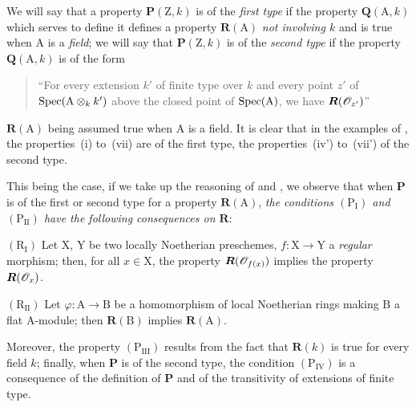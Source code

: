 \begin{env}[7.3.10]
\label{IV.7.3.10}
We will say that a property $\boldsymbol{P}(\mathrm{Z},k)$ is of the \emph{first type} if the property $\boldsymbol{Q}(\mathrm{A},k)$ which serves to define it defines a property $\boldsymbol{R}(\mathrm{A})$ \emph{not involving $k$} and is true when $\mathrm{A}$ is a \emph{field}; we will say that $\boldsymbol{P}(\mathrm{Z},k)$ is of the \emph{second type} if the property $\boldsymbol{Q}(\mathrm{A},k)$ is of the form
\begin{quote}
``For every extension $k'$ of finite type over $k$ and every point $z'$ of $\operatorname{Spec}(\mathrm{A}\otimes_k k')$ above the closed point of $\operatorname{Spec}(\mathrm{A})$, we have $\boldsymbol{R}(\mathscr{O}_{z'})$''
\end{quote}
$\boldsymbol{R}(\mathrm{A})$ being assumed true when $\mathrm{A}$ is a field.
It is clear that in the examples of , the properties~(i) to~(vii) are of the first type, the properties~(iv') to~(vii') of the second type.

This being the case, if we take up the reasoning of  and , we observe that when $\boldsymbol{P}$ is of the first or second type for a property $\boldsymbol{R}(\mathrm{A})$, \emph{the conditions $(\mathrm{P_I})$ and $(\mathrm{P_{II}})$ have the following consequences on $\boldsymbol{R}$}:

$(\mathrm{R_I})$ Let $\mathrm{X}$, $\mathrm{Y}$ be two locally Noetherian preschemes, $f:\mathrm{X}\to\mathrm{Y}$ a \emph{regular} morphism; then, for all $x\in\mathrm{X}$, the property $\boldsymbol{R}(\mathscr{O}_{f(x)})$ implies the property $\boldsymbol{R}(\mathscr{O}_x)$.

$(\mathrm{R_{II}})$ Let $\varphi:\mathrm{A}\to\mathrm{B}$ be a homomorphism of local Noetherian rings making $\mathrm{B}$ a flat $\mathrm{A}$-module; then $\boldsymbol{R}(\mathrm{B})$ implies $\boldsymbol{R}(\mathrm{A})$.

Moreover, the property $(\mathrm{P_{III}})$ results from the fact that $\boldsymbol{R}(k)$ is true for every field $k$; finally, when $\boldsymbol{P}$ is of the second type, the condition $(\mathrm{P_{IV}})$ is a consequence of the definition of $\boldsymbol{P}$ and of the transitivity of extensions of finite type.
\end{env}

